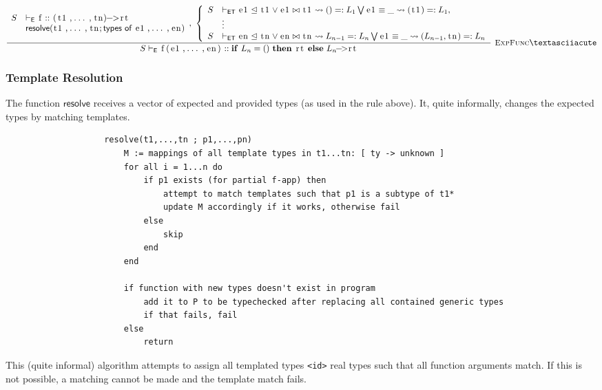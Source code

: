 \documentclass{article}
\newcommand{\code}[1]{\lstinline[columns=fixed]{#1}}
\newcommand{\drmrule}[5]{\frac{#1}{#2\vdash_{\mathsf{#3}}#4}\textsc{\ \small{#5}}}
\newcommand{\ruleapp}[1]{\vdash_{\mathsf{#1}}}
\newcommand{\mc}[1]{\textnormal{\code{#1}}}
\begin{document}
				\begin{small}
				\begin{align*}
					\drmrule{
						\begin{array}{rl}
							S&\ruleapp{E}\mc{f}::\mc{(t1,...,tn)->rt}\\
							&\mathsf{resolve}(\mc{t1,...,tn};\mathsf{types\ of\ }\mc{e1,...,en})
						\end{array},\ \left\{ 
						\begin{array}{rl}
							S&\ruleapp{ET}\mc{e1}\trianglelefteq\mc{t1}\vee\mc{e1}\bowtie\mc{t1} \leadsto ()=:L_1 \bigvee
								\mc{e1} \equiv \_ \leadsto (\mc{t1})=:L_1,\\
							&\vdots\\
							S&\ruleapp{ET}\mc{en}\trianglelefteq\mc{tn}\vee\mc{en}\bowtie\mc{tn} \leadsto L_{n-1}=:L_n \bigvee
								\mc{e1} \equiv \_ \leadsto (L_{n-1},\mc{tn})=:L_n
						\end{array}\right.}{S}{E}{\mc{f(e1,...,en)}:: \mathbf{if}\ L_n=()\ \mathbf{then}\ \mc{rt} \ \mathbf{else}\ L_n\mc{->rt}}{ExpFunc}´
				\end{align*}
				\end{small}
				
			\subsubsection{Template Resolution}
			
				The function $\mathsf{resolve}$ receives a vector of expected and provided types (as used in the rule above). It, quite informally, changes the expected types by matching templates.
				
				\begin{verbatim}
					resolve(t1,...,tn ; p1,...,pn)
					    M := mappings of all template types in t1...tn: [ ty -> unknown ]
					    for all i = 1...n do
					        if p1 exists (for partial f-app) then
					            attempt to match templates such that p1 is a subtype of t1*
					            update M accordingly if it works, otherwise fail
					        else
					            skip
					        end
					    end
					    
					    if function with new types doesn't exist in program
					    	add it to P to be typechecked after replacing all contained generic types
					    	if that fails, fail
					   	else
					   		return
				\end{verbatim}
				
				This (quite informal) algorithm attempts to assign all templated types \code{<id>} real types such that all function arguments match. If this is not possible, a matching cannot be made and the template match fails.
				
\end{document}
